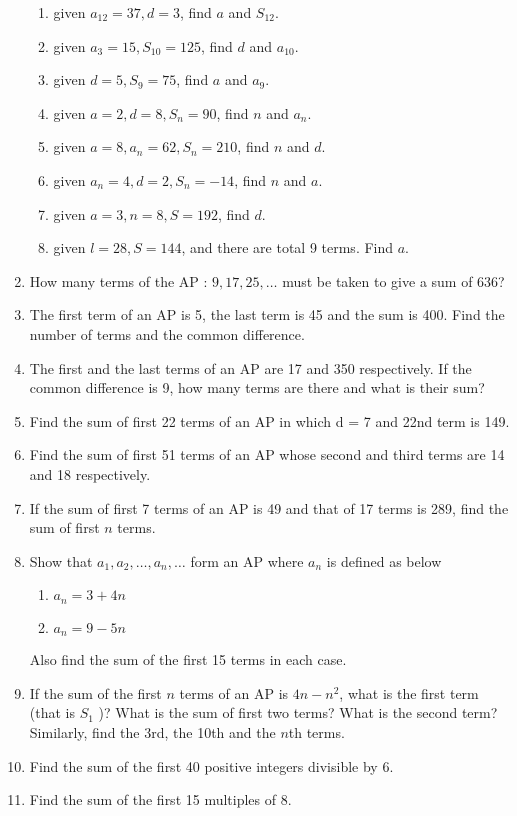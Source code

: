 \begin{enumerate}[label=\thesubsection.\arabic*, ref=\thesubsection.\theenumi]
\begin{enumerate}
\item  given $a_{12} = 37,  d = 3$,  find $a$ and $S_{12}$.
\item given $a_3 = 15,  S_{10} = 125$,  find $d$ and $a_{10}$.
\item given $d = 5,  S_9= 75$,  find $a$ and $a_9$.
\item given $a = 2,  d = 8,  S_n = 90$,  find $n$ and $a_n$.
\item  given $a = 8,  a_n = 62,  S_n = 210$,  find $n$ and $d$.
\item given $a_n = 4,  d = 2,  S_n = -14$,  find $n$ and $a$.
\item given $a = 3,  n = 8,  S = 192$,  find $d$.
\item given $l = 28,  S = 144$,  and there are total 9 terms. Find $a$.
\end{enumerate}
\item How many terms of the AP : $9,  17,  25,  \dots $ must be taken to give a sum of 636?
\item The first term of an AP is 5,  the last term is 45 and the sum is 400. Find the number of terms and the common difference.
\item The first and the last terms of an AP are 17 and 350 respectively. If the common difference is 9,  how many terms are there and what is their sum?
\item Find the sum of first 22 terms of an AP in which d = 7 and 22nd term is 149.
\item Find the sum of first 51 terms of an AP whose second and third terms are 14 and 18 respectively.
\item If the sum of first 7 terms of an AP is 49 and that of 17 terms is 289,  find the sum of first $n$ terms. 
\item Show that $a_1 ,  a_2 ,  \dots,  a_n,  \dots$  form an AP where $a_n$ is defined as below 
\begin{enumerate}
	\item $a_n = 3 + 4n$
	\item $a_n = 9 - 5n$
\end{enumerate}
Also find the sum of the first 15 terms in each case.
\item If the sum of the first $n$ terms of an AP is $4n - n^2$,  what is the first term (that is $S_1$ )? What
is the sum of first two terms? What is the second term? Similarly,  find the 3rd,  the 10th and
the $n$th terms.
\item Find the sum of the first 40 positive integers divisible by 6.
\item Find the sum of the first 15 multiples of 8.

\end{enumerate}
